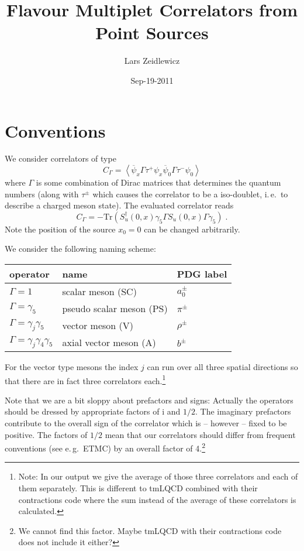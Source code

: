\documentclass[a4paper]{article}
\newcommand{\psibar}{\ensuremath{\overline\psi}}
\newcommand{\vev}[1]{\ensuremath{\left<#1\right>}}
\newcommand{\ii}{\ensuremath{\text{i}}}
\begin{document}
\author{Lars Zeidlewicz}
\date{Sep-19-2011}
\title{Flavour Multiplet Correlators from Point Sources}
\maketitle

\section{Conventions}

We consider correlators of type
\begin{equation}
C_\Gamma = \vev{\psibar_x \Gamma \tau^+ \psi_x \psibar_0 \Gamma \tau^- \psi_0}
\end{equation}
where $\Gamma$ is some combination of Dirac matrices that determines the quantum numbers (along with $\tau^\pm$ which causes the correlator to be a iso-doublet, i.\,e.\ to describe a charged meson state). The evaluated correlator reads
\begin{equation}
C_\Gamma = - \text{Tr} \left( S_u^\dagger(0,x) \gamma_5 \Gamma S_u(0,x) \Gamma \gamma_5 \right)\;.
\end{equation}
Note the position of the source $x_0 = 0$ can be changed arbitrarily.

We consider the following naming scheme:

\begin{tabular}{|lll|}
\hline
operator                           & name                      & PDG label\\
\hline\hline
$\Gamma = 1$                       & scalar meson (SC)         & $a_0^\pm$ \\
$\Gamma = \gamma_5$                & pseudo scalar meson (PS)  & $\pi^\pm$ \\
$\Gamma = \gamma_j\gamma_5$        & vector meson (V)          & $\rho^\pm$ \\
$\Gamma = \gamma_j\gamma_4\gamma_5$& axial vector meson (A)    & $b^\pm$\\
\hline
\end{tabular}

For the vector type mesons the index $j$ can run over all three spatial directions so that there are in fact three correlators each.\footnote{Note: In our output we give the average of those three correlators and each of them separately. This is different to tmLQCD combined with their contractions code where the sum instead of the average of these correlators is calculated.}

Note that we are a bit sloppy about prefactors and signs: Actually the operators should be dressed by appropriate factors of $\ii$ and $1/2$. The imaginary prefactors contribute to the overall sign of the correlator which is -- however -- fixed to be positive. The factors of $1/2$ mean that our correlators should differ from frequent conventions (see e.\,g.\ ETMC) by an overall factor of 4.\footnote{We cannot find this factor. Maybe tmLQCD with their contractions code does not include it either?}
\end{document}
